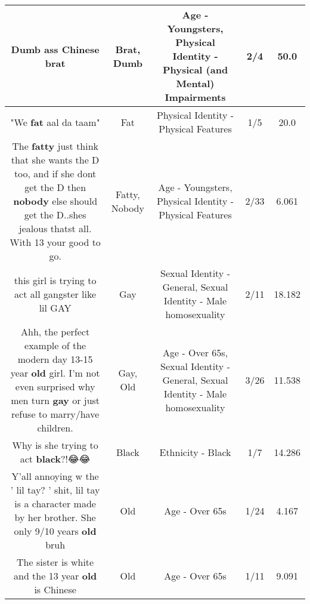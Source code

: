 \documentclass[11pt]{article}
\newlength\mylength
\begin{document}
\begin{center}
\begin{longtable}{|C{.65\mylength}|C{.30\mylength}|C{.12\mylength}|C{.12\mylength}|C{.12\mylength}|}
  \small Dumb ass Chinese brat\normalsize   & Brat, Dumb & Age - Youngsters, Physical Identity - Physical (and Mental) Impairments & 2/4 & 50.0 \\  \hline
  \small "We \textbf{fat} aal da taam"\normalsize   & Fat & Physical Identity - Physical Features & 1/5 & 20.0 \\  \hline
  \small The \textbf{fatty} just think that she wants the D too, and if she dont get the D then \textbf{nobody} else should get the D..shes jealous thatst all. With 13 your good to go.\normalsize   & Fatty, Nobody & Age - Youngsters, Physical Identity - Physical Features & 2/33 & 6.061 \\  \hline
  \small this girl is trying to act all gangster like lil GAY\normalsize   & Gay & Sexual Identity - General, Sexual Identity - Male homosexuality & 2/11 & 18.182 \\  \hline
  \small Ahh, the perfect example of the modern day 13-15 year \textbf{old} girl. I'm not even surprised why men turn \textbf{g\textbf{ay}} or just refuse to marry/have children.\normalsize   & Gay, Old & Age - Over 65s, Sexual Identity - General, Sexual Identity - Male homosexuality & 3/26 & 11.538 \\  \hline
  \small Why is she trying to act \textbf{black}?!😂😂\normalsize   & Black & Ethnicity - Black & 1/7 & 14.286 \\  \hline
  \small Y'all annoying w the ' lil tay? ' shit, lil tay is a character made by her brother. She only 9/10 years \textbf{old} bruh\normalsize   & Old & Age - Over 65s & 1/24 & 4.167 \\  \hline
  \small The sister is white and the 13 year \textbf{old} is Chinese\normalsize   & Old & Age - Over 65s & 1/11 & 9.091 \\  \hline

\end{longtable}
\end{center}
\end{document}
